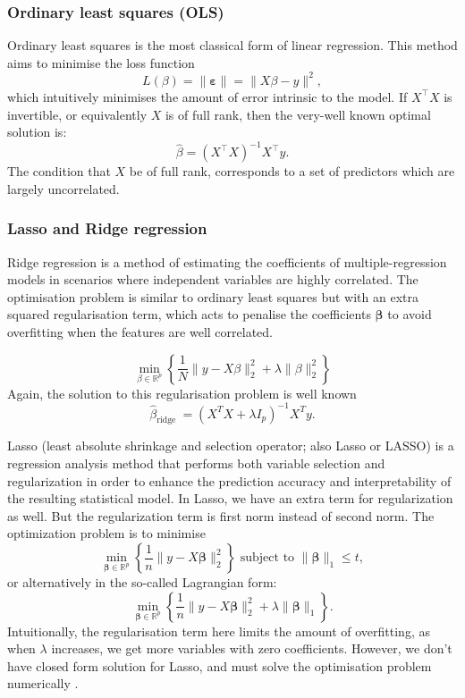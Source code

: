 \documentclass[twoside]{report}
\begin{document}
\begin{spacing}{1}
\subsubsection{Ordinary least squares (OLS)}
Ordinary least squares is the most classical form of linear regression. This method aims to minimise the loss function
\[
L({\beta})= \|\boldsymbol{\varepsilon}\|=\|X {\beta}-y\|^{2},
\]
which intuitively minimises the amount of error intrinsic to the model. If  $X^{\top} X$ is invertible, or equivalently $X$ is of full rank, then the very-well known optimal solution is:
\[
{\hat{\beta}}=\left(X^{\top} X\right)^{-1} X^{\top} y.
\]
The condition that $X$ be of full rank, corresponds to a set of predictors which are largely uncorrelated. 

\subsubsection{Lasso and Ridge regression}

Ridge regression is a method of estimating the coefficients of multiple-regression models in scenarios where independent variables are highly correlated. The optimisation problem is similar to ordinary least squares but with an extra squared regularisation term, which acts to penalise the coefficients $\boldsymbol{\beta}$ to avoid overfitting when the features are well correlated. 

\[
\min _{\beta \in \mathbb{R}^{p}}\left\{\frac{1}{N}\|y-X \beta\|_{2}^{2}+\lambda\|\beta\|_{2}^{2}\right\}
\]
Again, the solution to this regularisation problem is well known
\[
\widehat{\beta}_{\text {ridge }}=\left(X^{T} X+\lambda I_{p}\right)^{-1} X^{T} y.
\]



Lasso (least absolute shrinkage and selection operator; also Lasso or LASSO) is a regression analysis method that performs both variable selection and regularization in order to enhance the prediction accuracy and interpretability of the resulting statistical model. In Lasso, we have an extra term for regularization as well. But the regularization term is first norm instead of second norm.  The optimization problem is to minimise 
\[
\min _{\boldsymbol{\beta} \in \mathbb{R}^{p}}\left\{\frac{1}{n}\|y-X \boldsymbol{\beta}\|_{2}^{2}\right\} \text { subject to }\|\boldsymbol{\beta}\|_{1} \leq t,
\]
or alternatively in the so-called Lagrangian form:
\[
\min _{\boldsymbol{\beta} \in \mathbb{R}^{p}}\left\{\frac{1}{n}\|y-X \boldsymbol{\beta}\|_{2}^{2}+\lambda\|\boldsymbol{\beta}\|_{1}\right\}.
\]
Intuitionally, the regularisation term here limits the amount of overfitting, as when $\lambda$ increases, we get more variables with zero coefficients. However, we don't have closed form solution for Lasso, and must solve the optimisation problem numerically \cite{weisberg2005applied}.




\end{spacing}
\end{document}
